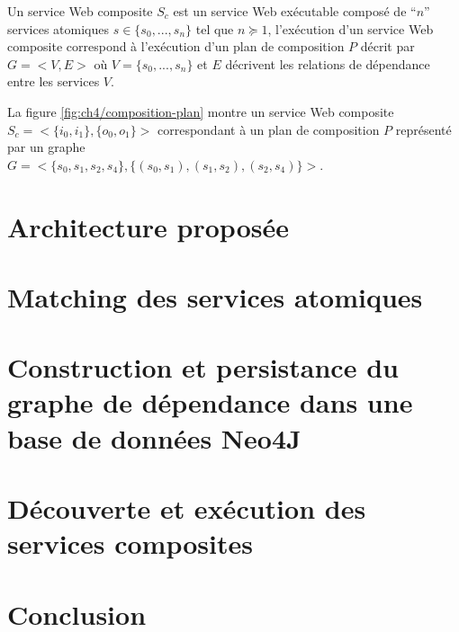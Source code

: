   \begin{mydef}
    Un service Web composite $S_c$ est un service Web exécutable
    composé de ``$n$'' services atomiques $s \in \{s_0,..., s_n\}$ tel
    que $n \succeq 1$, l'exécution d'un service Web composite
    correspond à l'exécution d'un plan de composition $P$ décrit par
    $G=<V,E>$ où $V = \{s_0, ..., s_n\}$ et $E$ décrivent les
    relations de dépendance entre les services $V$.
  \end{mydef}

  La figure \ref{fig:ch4/composition-plan} montre un service Web
  composite $S_c = <\{i_0, i_1\}, \{o_0, o_1\}>$ correspondant à un
  plan de composition $P$ représenté par un graphe\\ $G =<\{s_0, s_1,
  s_2, s_4\}, \{(s_0, s_1), (s_1, s_2), (s_2, s_4)\}>$.

\section{Architecture proposée}
\label{sec:proposition}

\section{Matching des services  atomiques}
\label{sec:ch4/matching}

\section{Construction et persistance du graphe de dépendance dans une
  base de données Neo4J}
\section{Découverte et exécution des services composites}

\section*{Conclusion}
\label{sec:conclusion}
 


